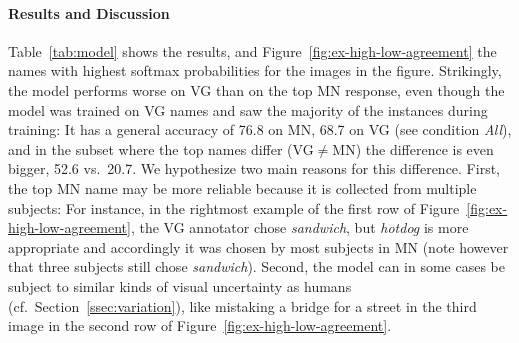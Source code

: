 \paragraph{Results and Discussion}
Table~\ref{tab:model} shows the results, and Figure~\ref{fig:ex-high-low-agreement} the names with highest softmax probabilities for the images in the figure.
Strikingly, the model performs worse on VG than on the top MN response, even though the model was trained on VG names and saw the majority of the instances during training: It has a general accuracy of 76.8 on MN, 68.7 on VG (see condition \textit{All}), and in the subset where the top names differ (VG$\neq$MN) the difference is even bigger, 52.6 vs.\ 20.7.
We hypothesize two main reasons for this difference.
First, the top MN name may be more reliable because it is collected from multiple subjects: For instance, in the rightmost example of the first row of Figure~\ref{fig:ex-high-low-agreement}, the VG annotator chose \textit{sandwich}, but \textit{hotdog} is more appropriate and accordingly it was chosen by most subjects in MN (note however that three subjects still chose \textit{sandwich}).
Second, the model can in some cases be subject to similar kinds of visual uncertainty as humans (cf.\ Section\ \ref{ssec:variation}), like mistaking a bridge for a street in the third image in the second row of Figure~\ref{fig:ex-high-low-agreement}.

